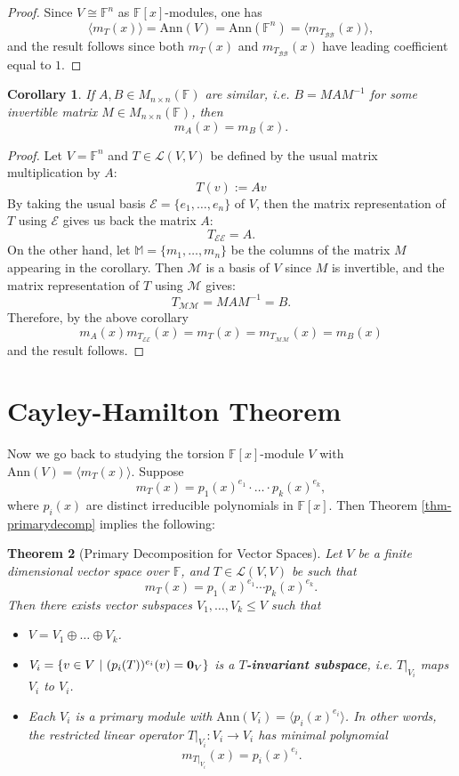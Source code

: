 \documentclass[12pt]{amsbook}
\newtheorem{theorem}{Theorem}[section]
\newtheorem{corollary}[theorem]{Corollary}
\begin{document}
\begin{proof}
    Since $V \cong \mathbb{F}^n$ as $\mathbb{F}[x]$-modules, one has
    $$\langle m_T(x) \rangle = \mathrm{Ann}(V) = \mathrm{Ann}(\mathbb{F}^n) = \langle m_{T_{\mathcal{B}\mathcal{B}}}(x) \rangle,$$
    and the result follows since both $m_T(x)$ and $m_{T_{\mathcal{B}\mathcal{B}}}(x)$ have leading coefficient equal to $1$.
\end{proof}


\begin{corollary} \label{cor-minpolyconj}
    If $A, B \in M_{n \times n}(\mathbb{F})$ are similar, i.e. $B = MAM^{-1}$ for some invertible matrix $M \in M_{n \times n}(\mathbb{F})$, then 
    $$m_{A}(x) = m_{B}(x).$$
\end{corollary}

\begin{proof}
Let $V = \mathbb{F}^n$ and $T \in \mathcal{L}(V,V)$ be defined by the usual matrix multiplication by $A$:
$$T(v) := Av$$
By taking the usual basis $\mathcal{E} = \{e_1, \dots, e_n\}$ of $V$, then the matrix representation of $T$ using $\mathcal{E}$ gives us back the matrix $A$:
$$T_{\mathcal{E}\mathcal{E}} = A.$$
On the other hand, let $\mathbb{M} = \{m_1, \dots, m_n\}$ be the columns of the matrix $M$ appearing in the corollary. Then $\mathcal{M}$ is a basis of $V$ since $M$ is invertible, and the matrix representation of $T$ using $\mathcal{M}$ gives:
$$T_{\mathcal{M}\mathcal{M}} = MAM^{-1} = B.$$
Therefore, by the above corollary
$$m_{A}(x) m_{T_{\mathcal{E}\mathcal{E}}}(x) = m_{T}(x) = m_{T_{\mathcal{M}\mathcal{M}}}(x) = m_{B}(x)$$
and the result follows.
\end{proof}

\section{Cayley-Hamilton Theorem}
Now we go back to studying the torsion $\mathbb{F}[x]$-module $V$ with $\mathrm{Ann}(V) = \langle m_T(x) \rangle$. Suppose
$$m_T(x) = p_1(x)^{e_1} \cdot \dots \cdot p_k(x)^{e_k},$$
where $p_i(x)$ are distinct irreducible polynomials in $\mathbb{F}[x]$. Then 
Theorem \ref{thm-primarydecomp} implies the following:
\begin{theorem}[Primary Decomposition for Vector Spaces] \label{thm-primaryvs}
Let $V$ be a finite dimensional vector space over $\mathbb{F}$, and $T \in \mathcal{L}(V,V)$ be such that
$$m_T(x) = p_1(x)^{e_1} \cdots p_k(x)^{e_k}.$$ 
Then there exists vector subspaces $V_1, \dots, V_k \leq V$ such that
\begin{itemize}
    \item $V = V_1 \oplus \dots \oplus V_k$.
    \item $V_i = \{v \in V\ |\ (p_i(T))^{e_i}(v) = {\bf 0}_V\}$ is a {\bf $T$-invariant subspace}, i.e. $T|_{V_i}$ maps $V_i$ to $V_i$.
    \item Each $V_i$ is a primary module with $\mathrm{Ann}(V_i) = \langle p_i(x)^{e_i} \rangle$. In other words, the restricted linear operator $T|_{V_i}: V_i \to V_i$ has minimal polynomial 
    $$m_{T|_{V_i}}(x) = p_i(x)^{e_i}.$$
\end{itemize}
\end{theorem}
\end{document}
